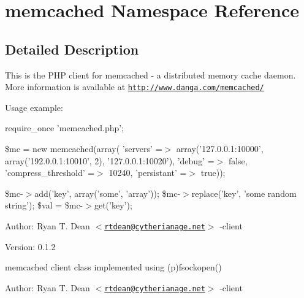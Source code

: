 \hypertarget{namespacememcached}{
\section{memcached Namespace Reference}
\label{namespacememcached}
}


\subsection{Detailed Description}
This is the PHP client for memcached - a distributed memory cache daemon. More information is available at \href{http://www.danga.com/memcached/}{\tt http://www.danga.com/memcached/}

Usage example:

require\_\-once 'memcached.php';

\$mc = new memcached(array( 'servers' =$>$ array('127.0.0.1:10000', array('192.0.0.1:10010', 2), '127.0.0.1:10020'), 'debug' =$>$ false, 'compress\_\-threshold' =$>$ 10240, 'persistant' =$>$ true));

\$mc-$>$add('key', array('some', 'array')); \$mc-$>$replace('key', 'some random string'); \$val = \$mc-$>$get('key');

\begin{Desc}
\item[Author:]Ryan T. Dean $<$\href{mailto:rtdean@cytherianage.net}{\tt rtdean@cytherianage.net}$>$ -client \end{Desc}
\begin{Desc}
\item[Version:]0.1.2\end{Desc}
memcached client class implemented using (p)fsockopen()

\begin{Desc}
\item[Author:]Ryan T. Dean $<$\href{mailto:rtdean@cytherianage.net}{\tt rtdean@cytherianage.net}$>$ -client \end{Desc}


